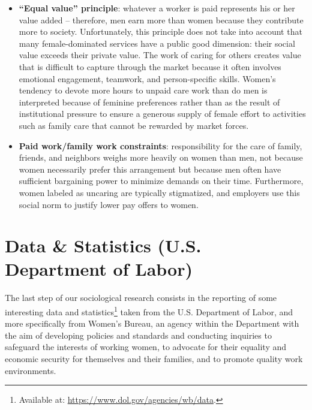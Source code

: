 \begin{itemize}
\item \textbf{``Equal value'' principle}: whatever a worker is paid represents his or her value added -- therefore, men earn more than women because they contribute more to society. Unfortunately, this principle does not take into account that many female-dominated services have a public good dimension: their social value exceeds their private value. The work of caring for others creates value that is difficult to capture through the market because it often involves emotional engagement, teamwork, and person-specific skills. Women's tendency to devote more hours to unpaid care work than do men is interpreted because of feminine preferences rather than as the result of institutional pressure to ensure a generous supply of female effort to activities such as family care that cannot be rewarded by market forces.
\item \textbf{Paid work/family work constraints}: responsibility for the care of family, friends, and neighbors weighs more heavily on women than men, not because women necessarily prefer this arrangement but because men often have sufficient bargaining power to minimize demands on their time. Furthermore, women labeled as uncaring are typically stigmatized, and employers use this social norm to justify lower pay offers to women.
\end{itemize}


\section{Data \& Statistics (U.S. Department of Labor)}
The last step of our sociological research consists in the reporting of some interesting data and statistics\footnote{Available at: \url{https://www.dol.gov/agencies/wb/data}.} taken from the U.S. Department of Labor, and more specifically from Women's Bureau, an agency within the Department with the aim of developing policies and standards and conducting inquiries to safeguard the interests of working women, to advocate for their equality and economic security for themselves and their families, and to promote quality work environments.

